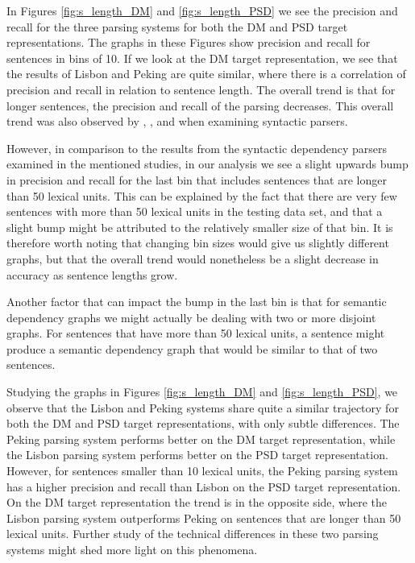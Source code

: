 In Figures \ref{fig:s_length_DM} and \ref{fig:s_length_PSD} we see the precision and recall for the three parsing systems for both the DM and PSD target representations. The graphs in these Figures show precision and recall for sentences in bins of 10. If we look at the DM target representation, we see that the results of Lisbon and Peking are quite similar, where there is a correlation of precision and recall in relation to sentence length. The overall trend is that for longer sentences, the precision and recall of the parsing decreases. This overall trend was also observed by , , and  when examining syntactic parsers.

However, in comparison to the results from the syntactic dependency parsers examined in the mentioned studies, in our analysis we see a slight upwards bump in precision and recall for the last bin that includes sentences that are longer than 50 lexical units. This can be explained by the fact that there are very few sentences with more than 50 lexical units in the testing data set, and that a slight bump might be attributed to the relatively smaller size of that bin. It is therefore worth noting that changing bin sizes would give us slightly different graphs, but that the overall trend would nonetheless be a slight decrease in accuracy as sentence lengths grow.

Another factor that can impact the bump in the last bin is that for semantic dependency graphs we might actually be dealing with two or more disjoint graphs. For sentences that have more than 50 lexical units, a sentence might produce a semantic dependency graph that would be similar to that of two sentences.

Studying the graphs in Figures \ref{fig:s_length_DM} and \ref{fig:s_length_PSD}, we observe that the Lisbon and Peking systems share quite a similar trajectory for both the DM and PSD target representations, with only subtle differences. The Peking parsing system performs better on the DM target representation, while the Lisbon parsing system performs better on the PSD target representation. However, for sentences smaller than 10 lexical units, the Peking parsing system has a higher precision and recall than Lisbon on the PSD target representation. On the DM target representation the trend is in the opposite side, where the Lisbon parsing system outperforms Peking on sentences that are longer than 50 lexical units. Further study of the technical differences in these two parsing systems might shed more light on this phenomena.

